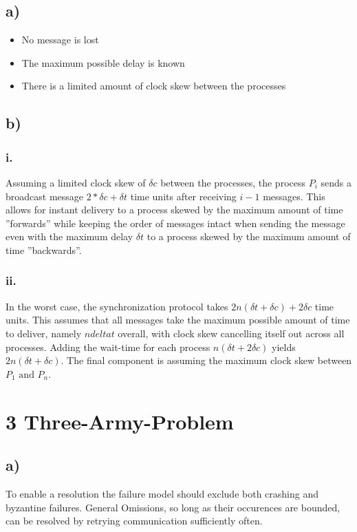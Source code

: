 \documentclass{scrartcl}
\begin{document}
\subsection*{a)}
\begin{itemize}
	\item No message is lost
	\item The maximum possible delay is known
	\item There is a limited amount of clock skew between the processes
\end{itemize}
\subsection*{b)}
\subsubsection*{i.}
Assuming a limited clock skew of \(\delta c\) between the processes, the process \(P_i\) sends a broadcast message \(2 * \delta c + \delta t\) time units after receiving \(i - 1\) messages.
This allows for instant delivery to a process skewed by the maximum amount of time ''forwards'' while keeping the order of messages intact when sending the message even with the maximum delay \(\delta t\) to a process skewed by the maximum amount of time ''backwards''.
\subsubsection*{ii.}
In the worst case, the synchronization protocol takes \(2n (\delta t + \delta c) + 2\delta c\) time units.
This assumes that all messages take the maximum possible amount of time to deliver, namely \(n delta t\) overall, with clock skew cancelling itself out across all processes.
Adding the wait-time for each process \(n(\delta t + 2\delta c)\) yields \(2n (\delta t + \delta c)\).
The final component is assuming the maximum clock skew between \(P_1 \text{ and } P_n\).

\section*{3 Three-Army-Problem}
\subsection*{a)}
To enable a resolution the failure model should exclude both crashing and byzantine failures.
General Omissions, so long as their occurences are bounded, can be resolved by retrying communication sufficiently often.
\end{document}
